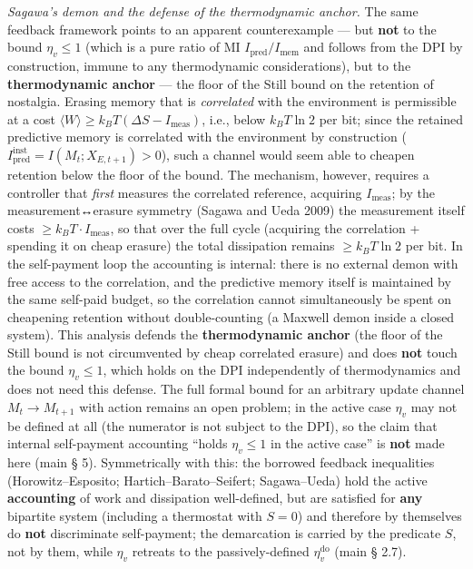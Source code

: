 \documentclass[pdflatex,sn-mathphys-ay]{sn-jnl}
\begin{document}
\emph{Sagawa's demon and the defense of the thermodynamic anchor.} The same feedback framework points to an apparent counterexample --- but \textbf{not} to the bound \(\eta_v \le 1\) (which is a pure ratio of MI \(I_{\text{pred}}/I_{\text{mem}}\) and follows from the DPI by construction, immune to any thermodynamic considerations), but to the \textbf{thermodynamic anchor} --- the floor of the Still bound on the retention of nostalgia. Erasing memory that is \emph{correlated} with the environment is permissible at a cost \(\langle W\rangle \ge k_B T(\Delta S - I_{\text{meas}})\), i.e., below \(k_B T \ln 2\) per bit; since the retained predictive memory is correlated with the environment by construction (\(I_{\text{pred}}^{\text{inst}} = I(M_t; X_{E,t+1}) > 0\)), such a channel would seem able to cheapen retention below the floor of the bound. The mechanism, however, requires a controller that \emph{first} measures the correlated reference, acquiring \(I_{\text{meas}}\); by the measurement↔erasure symmetry (Sagawa and Ueda 2009) the measurement itself costs \(\ge k_B T \cdot I_{\text{meas}}\), so that over the full cycle (acquiring the correlation + spending it on cheap erasure) the total dissipation remains \(\ge k_B T \ln 2\) per bit. In the self-payment loop the accounting is internal: there is no external demon with free access to the correlation, and the predictive memory itself is maintained by the same self-paid budget, so the correlation cannot simultaneously be spent on cheapening retention without double-counting (a Maxwell demon inside a closed system). This analysis defends the \textbf{thermodynamic anchor} (the floor of the Still bound is not circumvented by cheap correlated erasure) and does \textbf{not} touch the bound \(\eta_v \le 1\), which holds on the DPI independently of thermodynamics and does not need this defense. The full formal bound for an arbitrary update channel \(M_t \to M_{t+1}\) with action remains an open problem; in the active case \(\eta_v\) may not be defined at all (the numerator is not subject to the DPI), so the claim that internal self-payment accounting ``holds \(\eta_v \le 1\) in the active case'' is \textbf{not} made here (main § 5). Symmetrically with this: the borrowed feedback inequalities (Horowitz--Esposito; Hartich--Barato--Seifert; Sagawa--Ueda) hold the active \textbf{accounting} of work and dissipation well-defined, but are satisfied for \textbf{any} bipartite system (including a thermostat with \(S = 0\)) and therefore by themselves do \textbf{not} discriminate self-payment; the demarcation is carried by the predicate \(S\), not by them, while \(\eta_v\) retreats to the passively-defined \(\eta_v^{\mathrm{do}}\) (main § 2.7).
\end{document}
